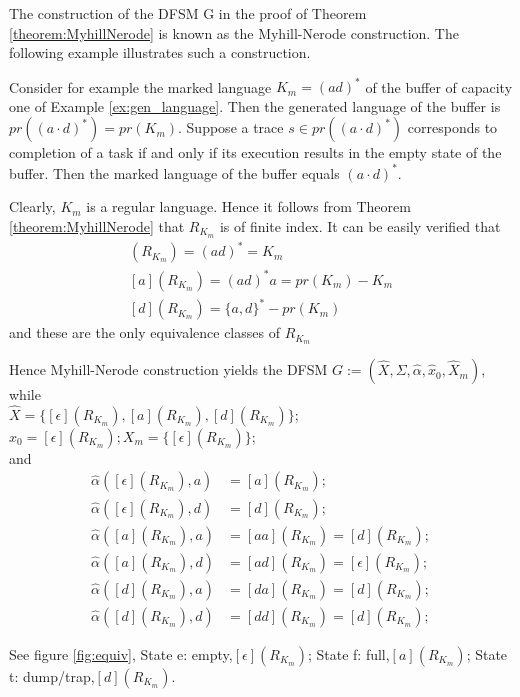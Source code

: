 The construction of the DFSM G in the proof of Theorem \ref{theorem:MyhillNerode} is known as the Myhill-Nerode construction. The following example illustrates such a construction.

\begin{example}
	Consider for example the marked language $K_m = (ad)^\ast$ of
	the buffer of capacity one of Example \ref{ex:gen_language}. 
	Then the generated language of the buffer is $pr((a\cdot d)^\ast)=pr(K_m)$. Suppose a trace $s\in pr((a\cdot d)^\ast)$ corresponds to completion of a task if and only if its execution results in the empty state of the buffer. Then the marked language of the buffer equals $(a\cdot d)^\ast$.
	
	Clearly, $K_m$ is a regular language.
	Hence it follows from Theorem \ref{theorem:MyhillNerode} that $R_{K_m}$ is of finite index. It can be easily verified that
	\begin{gather*}
		[\epsilon](R_{K_m})=(ad)^\ast=K_m\\
		[a](R_{K_m})=(ad)^\ast a=pr(K_m)-K_m\\
		[d](R_{K_m})=\{a,d\}^\ast-pr(K_m)
	\end{gather*}
	and these are the only equivalence classes of $R_{K_m}$
	
	Hence Myhill-Nerode construction yields the DFSM $G:=(\hat{X},\Sigma,\hat{\alpha},\hat{x}_0,\hat{X}_m)$, while\\ 
	$\hat{X}=\{[\epsilon](R_{K_m}),[a](R_{K_m}),[d](R_{K_m}) \}$;
	$\hat{x}_0=[\epsilon](R_{K_m}); X_m=\{[\epsilon](R_{K_m}) \}$;\\
	and
	\begin{align*}
		\hat{\alpha}([\epsilon](R_{K_m}),a)&=[a](R_{K_m});\\
		\hat{\alpha}([\epsilon](R_{K_m}),d)&=[d](R_{K_m});\\
		\hat{\alpha}([a](R_{K_m}),a)&=[aa](R_{K_m})=[d](R_{K_m});\\
		\hat{\alpha}([a](R_{K_m}),d)&=[ad](R_{K_m})=[\epsilon](R_{K_m});\\
		\hat{\alpha}([d](R_{K_m}),a)&=[da](R_{K_m})=[d](R_{K_m});\\
		\hat{\alpha}([d](R_{K_m}),d)&=[dd](R_{K_m})=[d](R_{K_m});
	\end{align*}
	
	See figure \ref{fig:equiv}, State e: empty,$[\epsilon](R_{K_m})$;
	State f: full,$[a](R_{K_m})$;  State t: dump/trap,$[d](R_{K_m})$.
	

\end{example}
